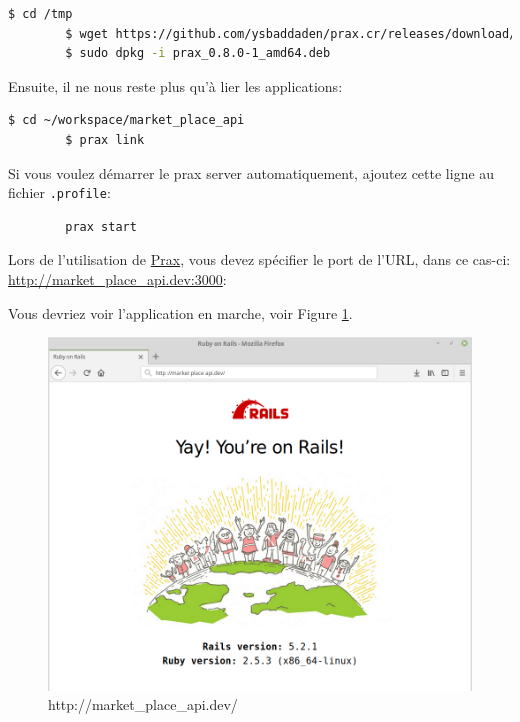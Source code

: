 \documentclass[]{report}
\begin{document}
        \begin{scriptsize}
        \begin{lstlisting}[language=bash, breaklines]
        $ cd /tmp
        $ wget https://github.com/ysbaddaden/prax.cr/releases/download/v0.8.0/prax_0.8.0-1_amd64.deb
        $ sudo dpkg -i prax_0.8.0-1_amd64.deb
        \end{lstlisting}
        \end{scriptsize}

        Ensuite, il ne nous reste plus qu'à lier les applications:

        \begin{scriptsize}
        \begin{lstlisting}[language=bash]
        $ cd ~/workspace/market_place_api
        $ prax link
        \end{lstlisting}
        \end{scriptsize}

        Si vous voulez démarrer le prax server automatiquement, ajoutez cette ligne au fichier \verb|.profile|:

        \begin{scriptsize}
        \begin{lstlisting}
        prax start
        \end{lstlisting}
        \end{scriptsize}

        Lors de l'utilisation de \href{https://github.com/ysbaddaden/prax.cr}{Prax}, vous devez spécifier le port de l'URL, dans ce cas-ci: \href{http://market_place_api.dev:3000/}{http://market\_place\_api.dev:3000}:

        Vous devriez voir l'application en marche, voir Figure \ref{fig:pow_running}.

        \begin{figure}
          \includegraphics[width=\linewidth]{img/pow_running.png}
          \caption{http://market\_place\_api.dev/}
          \label{fig:pow_running}
        \end{figure}
\end{document}
